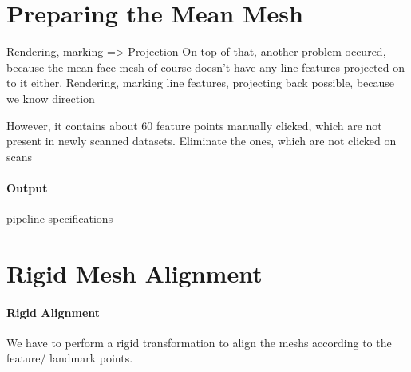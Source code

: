 \section{Preparing the Mean Mesh}
Rendering, marking => Projection
On top of that, another problem occured, because the mean face mesh of course doesn't have any line features projected on to it either.
Rendering, marking line features, projecting back possible, because we know direction

However, it contains about 60 feature points manually clicked, which are not present in newly scanned datasets. 
Eliminate the ones, which are not clicked on scans

\paragraph{Output}

pipeline specifications
\section{Rigid Mesh Alignment}
\paragraph{Rigid Alignment}
We have to perform a rigid transformation to align the meshs according to the feature/ landmark points.

